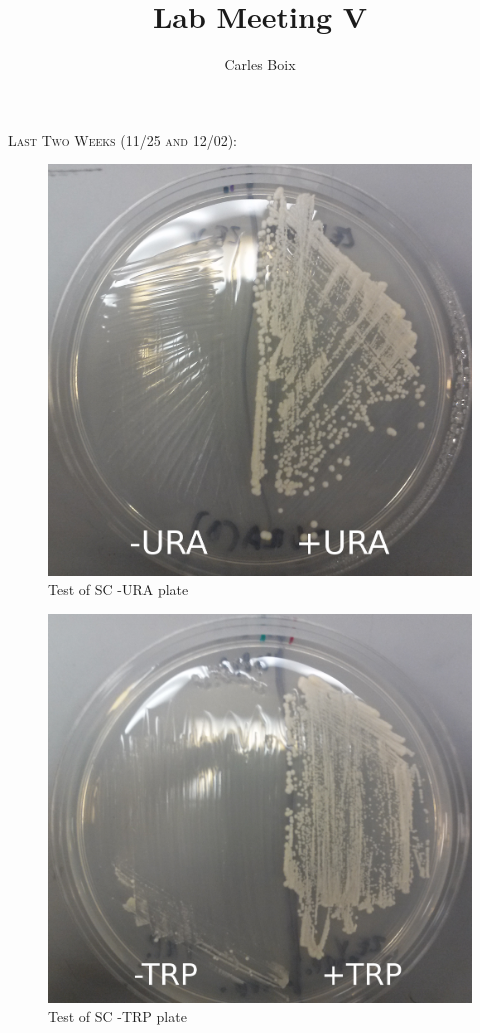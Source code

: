 \documentclass{beamer}
\title[Lab Meeting V]{Lab Meeting V}
\author{Carles Boix}
\begin{document}
\begin{frame}
    \begin{center}
        {\large \textsc{Last Two Weeks (11/25 and 12/02):}}
    \end{center}
    \begin{minipage}[ht!]{.48\textwidth}
          \begin{figure}[ht!]
            \centering
            \includegraphics[width=.9\textwidth]{URAtest.png}
            \caption{Test of SC -URA plate}
            \label{fig:pcr}
        \end{figure}
    \end{minipage}
    \hfill
    \begin{minipage}[ht!]{.48\textwidth}
         \begin{figure}[ht!]
            \centering
            \includegraphics[width=.9\textwidth]{TRPtest.png}
            \caption{Test of SC -TRP plate}
            \label{fig:pcr}
        \end{figure}
    \end{minipage}

\end{frame}
\end{document}
